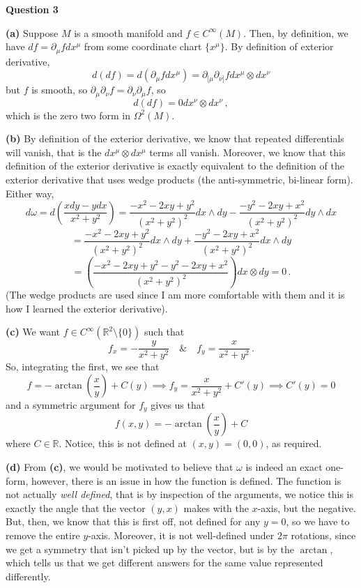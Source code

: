 \documentclass[10pt]{article}
\newcommand{\R}{\mathbb{R}}
\begin{document}
\newpage
\textbf{Question 3}

\textbf{(a)} Suppose $M$ is a smooth manifold and $f\in C^{\infty}(M)$. Then, by definition, we have $df = \partial_{\mu}fdx^{\mu}$ from some coordinate chart $\{x^{\mu}\}$. By definition of exterior derivative,
\[ d(df) = d(\partial_{\mu}fdx^{\mu}) = \partial_{[\mu}\partial_{\nu]}fdx^{\mu}\otimes dx^{\nu} \]
but $f$ is smooth, so $\partial_{\mu}\partial_{\nu}f = \partial_{\nu}\partial_{\mu}f$, so
\[ d(df) = 0dx^{\nu}\otimes dx^{\nu}\, , \]
which is the zero two form in $\Omega^{2}(M)$.

\textbf{(b)} By definition of the exterior derivative, we know that repeated differentials will vanish, that is the $dx^{\mu}\otimes dx^{\mu}$ terms all vanish. Moreover, we know that this definition of the exterior derivative is exactly equivalent to the definition of the exterior derivative that uses wedge products (the anti-symmetric, bi-linear form). Either way, 
\[ d\omega = d\left(\frac{xdy - ydx}{x^{2} + y^{2}}\right) = \frac{-x^{2} -2xy + y^{2}}{(x^{2}+y^{2})^{2}}dx\wedge dy - \frac{-y^{2} - 2xy + x^{2}}{(x^{2} + y^{2})^{2}}dy \wedge dx \]
\[ = \frac{-x^{2} -2xy + y^{2}}{(x^{2}+y^{2})^{2}}dx\wedge dy + \frac{-y^{2} - 2xy + x^{2}}{(x^{2} + y^{2})^{2}}dx \wedge dy \]
\[= \left(\frac{-x^{2} -2xy + y^{2} -y^{2} - 2xy + x^{2}}{(x^{2} + y^{2})^{2}}\right) dx \otimes dy = 0\, .\]
(The wedge products are used since I am more comfortable with them and it is how I learned the exterior derivative).

\textbf{(c)} We want $f\in C^{\infty}(\R^{2}\setminus \{0\})$ such that
\[ f_{x} = -\frac{y}{x^{2} + y^{2}} \quad \& \quad f_{y} = \frac{x}{x^{2} + y^{2}}\, . \]
So, integrating the first, we see that
\[ f = -\arctan\left(\frac{x}{y}\right) + C(y) \implies f_{y} = \frac{x}{x^{2} + y^{2}} + C'(y) \implies C'(y) = 0\]
and a symmetric argument for $f_{y}$ gives us that
\[ f(x,y) = -\arctan\left(\frac{x}{y}\right) + C\]
where $C\in \R$. Notice, this is not defined at $(x,y) = (0,0)$, as required.

\textbf{(d)} From \textbf{(c)}, we would be motivated to believe that $\omega$ is indeed an exact one-form, however, there is an issue in how the function is defined. The function is not actually \textit{well defined}, that is by inspection of the arguments, we notice this is exactly the angle that the vector $(y,x)$ makes with the $x$-axis, but the negative. But, then, we know that this is first off, not defined for any $y=0$, so we have to remove the entire $y$-axis. Moreover, it is not well-defined under $2\pi$ rotations, since we get a symmetry that isn't picked up by the vector, but is by the $\arctan$, which tells us that we get different answers for the same value represented differently.
\end{document}
